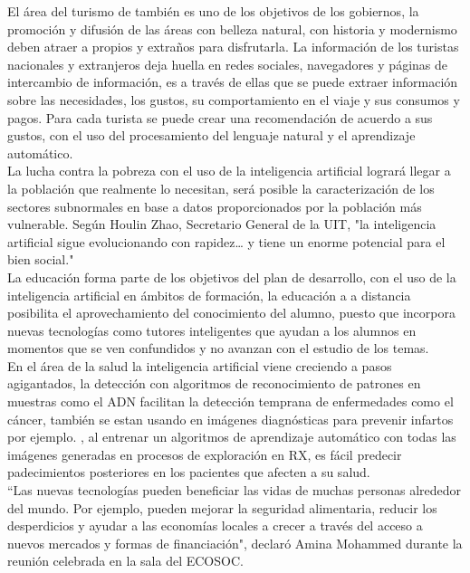 \documentclass[preprint,12pt,3p]{elsarticle}
\begin{document}
El área del turismo de también es uno de los objetivos de los gobiernos, la promoción y difusión de las áreas con belleza natural, con historia y modernismo deben atraer a propios y extraños para disfrutarla. La información de los turistas nacionales y extranjeros deja huella en redes sociales, navegadores y páginas de intercambio de información, es a través de ellas que se puede extraer información sobre las necesidades, los gustos, su comportamiento en el viaje y sus consumos y pagos. Para cada turista se puede crear una recomendación de acuerdo a sus gustos, con el uso del procesamiento del lenguaje natural y el aprendizaje automático.\cite{almeida2019robots}\\

La lucha contra la pobreza con el uso de la inteligencia artificial logrará llegar a la población que realmente lo necesitan, será posible la caracterización de los sectores subnormales en base a datos proporcionados por la población más vulnerable.\cite{arroyave2019inteligencia} 
Según Houlin Zhao, Secretario General de la UIT, "la inteligencia artificial  sigue evolucionando con rapidez… y tiene un enorme potencial para el bien social." \\ 

La educación forma parte de los objetivos del plan de desarrollo, con el uso de la inteligencia artificial en ámbitos de formación, la educación a a distancia posibilita el aprovechamiento del conocimiento del alumno, puesto que incorpora nuevas tecnologías como tutores inteligentes que ayudan a los alumnos en momentos que se ven confundidos y no avanzan con el estudio de los temas. \cite{vila2007monografia}\\

En el área de la salud la inteligencia artificial viene creciendo a pasos agigantados, la detección con algoritmos de reconocimiento de patrones en muestras como el ADN facilitan la detección temprana de enfermedades como el cáncer, también se estan usando en imágenes diagnósticas para prevenir infartos por ejemplo. \cite{arroyave2019inteligencia}, al entrenar un algoritmos de aprendizaje automático con todas las imágenes generadas en procesos de exploración en RX, es fácil predecir padecimientos posteriores en los pacientes que afecten a su salud. \\

``Las nuevas tecnologías pueden beneficiar las vidas de muchas personas alrededor del mundo. Por ejemplo, pueden mejorar la seguridad alimentaria, reducir los desperdicios y ayudar a las economías locales a crecer a través del acceso a nuevos mercados y formas de financiación", declaró Amina Mohammed durante la reunión celebrada en la sala del ECOSOC.\\
\end{document}
